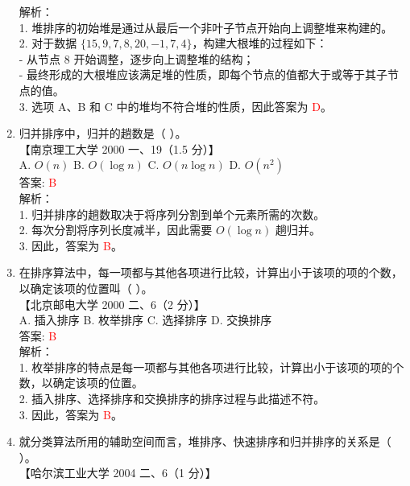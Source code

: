 \documentclass[lang=cn,newtx,10pt,scheme=chinese]{../../../elegantbook}
\begin{document}
\begin{enumerate}
    解析：\\
    1. 堆排序的初始堆是通过从最后一个非叶子节点开始向上调整堆来构建的。\\
    2. 对于数据 $\{15, 9, 7, 8, 20, -1, 7, 4\}$，构建大根堆的过程如下：\\
       - 从节点 $8$ 开始调整，逐步向上调整堆的结构；\\
       - 最终形成的大根堆应该满足堆的性质，即每个节点的值都大于或等于其子节点的值。\\
    3. 选项 A、B 和 C 中的堆均不符合堆的性质，因此答案为 \textcolor{red}{D}。\\

    \item 归并排序中，归并的趟数是（ ）。\\
    【南京理工大学 2000 一、19（1.5 分）】\\  

    A. $O(n)$ \quad B. $O(\log n)$ \quad C. $O(n \log n)$ \quad D. $O(n^2)$ \\  

    答案: \textcolor{red}{B} \\

    解析：\\
    1. 归并排序的趟数取决于将序列分割到单个元素所需的次数。\\
    2. 每次分割将序列长度减半，因此需要 $O(\log n)$ 趟归并。\\
    3. 因此，答案为 \textcolor{red}{B}。\\

\item 在排序算法中，每一项都与其他各项进行比较，计算出小于该项的项的个数，以确定该项的位置叫（ ）。\\
    【北京邮电大学 2000 二、6（2 分）】\\  

    A. 插入排序 \quad B. 枚举排序 \quad C. 选择排序 \quad D. 交换排序 \\  

    答案: \textcolor{red}{B} \\

    解析：\\
    1. 枚举排序的特点是每一项都与其他各项进行比较，计算出小于该项的项的个数，以确定该项的位置。\\
    2. 插入排序、选择排序和交换排序的排序过程与此描述不符。\\
    3. 因此，答案为 \textcolor{red}{B}。\\

\item 就分类算法所用的辅助空间而言，堆排序、快速排序和归并排序的关系是（ ）。\\
    【哈尔滨工业大学 2004 二、6（1 分）】\\  


\end{enumerate}
\end{document}
